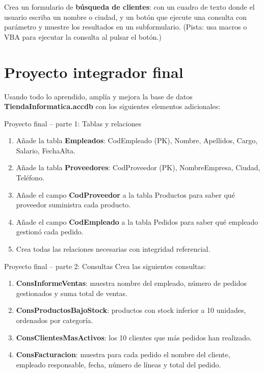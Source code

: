 \documentclass[12pt,a4paper]{article}
\begin{document}
\begin{reto}
Crea un formulario de \textbf{búsqueda de clientes}: con un cuadro de texto donde el usuario escriba un nombre o ciudad, y un botón que ejecute una consulta con parámetro y muestre los resultados en un subformulario. (Pista: usa macros o VBA para ejecutar la consulta al pulsar el botón.)
\end{reto}

\section{Proyecto integrador final}

\begin{tcolorbox}[colback=lightgray, colframe=accessred, title=\textbf{Proyecto Final: Base de datos completa}, colbacktitle=accessred, fonttitle=\bfseries\color{white}]
Usando todo lo aprendido, amplía y mejora la base de datos \textbf{TiendaInformatica.accdb} con los siguientes elementos adicionales:
\end{tcolorbox}

\begin{practica}{Proyecto final -- parte 1: Tablas y relaciones}
\begin{enumerate}
  \item Añade la tabla \textbf{Empleados}: CodEmpleado (PK), Nombre, Apellidos, Cargo, Salario, FechaAlta.
  \item Añade la tabla \textbf{Proveedores}: CodProveedor (PK), NombreEmpresa, Ciudad, Teléfono.
  \item Añade el campo \textbf{CodProveedor} a la tabla Productos para saber qué proveedor suministra cada producto.
  \item Añade el campo \textbf{CodEmpleado} a la tabla Pedidos para saber qué empleado gestionó cada pedido.
  \item Crea todas las relaciones necesarias con integridad referencial.
\end{enumerate}
\end{practica}

\begin{practica}{Proyecto final -- parte 2: Consultas}
Crea las siguientes consultas:
\begin{enumerate}
  \item \textbf{ConsInformeVentas}: muestra nombre del empleado, número de pedidos gestionados y suma total de ventas.
  \item \textbf{ConsProductosBajoStock}: productos con stock inferior a 10 unidades, ordenados por categoría.
  \item \textbf{ConsClientesMasActivos}: los 10 clientes que más pedidos han realizado.
  \item \textbf{ConsFacturacion}: muestra para cada pedido el nombre del cliente, empleado responsable, fecha, número de líneas y total del pedido.
\end{enumerate}
\end{practica}
\end{document}
